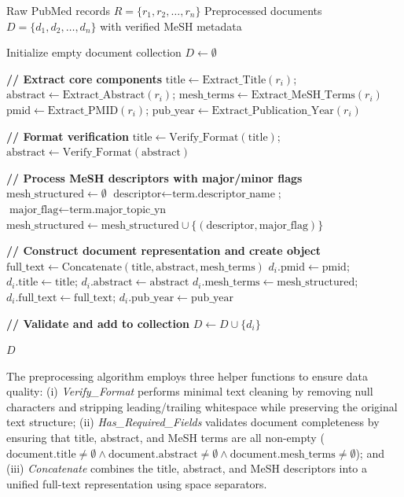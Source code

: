 \documentclass{ieeeaccess}
\begin{document}
\begin{algorithm*}[t]
\caption{Biomedical Document Preprocessing for Transformer-Based Embeddings}
\label{alg:preprocessing}
\begin{algorithmic}[1]
\Require Raw PubMed records $R = \{r_1, r_2, \ldots, r_n\}$
\Ensure Preprocessed documents $D = \{d_1, d_2, \ldots, d_n\}$ with verified MeSH metadata

\State Initialize empty document collection $D \gets \emptyset$

    \State \textbf{// Extract core components}
    \State $\text{title} \gets \text{Extract\_Title}(r_i)$; $\text{abstract} \gets \text{Extract\_Abstract}(r_i)$; $\text{mesh\_terms} \gets \text{Extract\_MeSH\_Terms}(r_i)$
    \State $\text{pmid} \gets \text{Extract\_PMID}(r_i)$; $\text{pub\_year} \gets \text{Extract\_Publication\_Year}(r_i)$

    \State \textbf{// Format verification}
    \State $\text{title} \gets \text{Verify\_Format}(\text{title})$; $\text{abstract} \gets \text{Verify\_Format}(\text{abstract})$

    \State \textbf{// Process MeSH descriptors with major/minor flags}
    \State $\text{mesh\_structured} \gets \emptyset$
        \State $\text{descriptor} \gets \text{term.descriptor\_name}$; $\text{major\_flag} \gets \text{term.major\_topic\_yn}$
        \State $\text{mesh\_structured} \gets \text{mesh\_structured} \cup \{(\text{descriptor}, \text{major\_flag})\}$
    \EndFor

    \State \textbf{// Construct document representation and create object}
    \State $\text{full\_text} \gets \text{Concatenate}(\text{title}, \text{abstract}, \text{mesh\_terms})$
    \State $d_i.\text{pmid} \gets \text{pmid}$; $d_i.\text{title} \gets \text{title}$; $d_i.\text{abstract} \gets \text{abstract}$
    \State $d_i.\text{mesh\_terms} \gets \text{mesh\_structured}$; $d_i.\text{full\_text} \gets \text{full\_text}$; $d_i.\text{pub\_year} \gets \text{pub\_year}$

    \State \textbf{// Validate and add to collection}
        \State $D \gets D \cup \{d_i\}$
    \EndIf
\EndFor

\State \Return $D$
\end{algorithmic}
\end{algorithm*}

The preprocessing algorithm employs three helper functions to ensure data quality: (i) \textit{Verify\_Format} performs minimal text cleaning by removing null characters and stripping leading/trailing whitespace while preserving the original text structure; (ii) \textit{Has\_Required\_Fields} validates document completeness by ensuring that title, abstract, and MeSH terms are all non-empty ($\text{document.title} \neq \emptyset \land \text{document.abstract} \neq \emptyset \land \text{document.mesh\_terms} \neq \emptyset$); and (iii) \textit{Concatenate} combines the title, abstract, and MeSH descriptors into a unified full-text representation using space separators.
\end{document}
